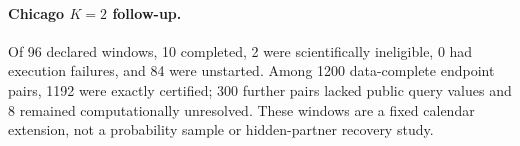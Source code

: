 \paragraph{Chicago $K=2$ follow-up.} Of 96 declared windows, 10 completed, 2 were scientifically ineligible, 0 had execution failures, and 84 were unstarted. Among 1200 data-complete endpoint pairs, 1192 were exactly certified; 300 further pairs lacked public query values and 8 remained computationally unresolved. These windows are a fixed calendar extension, not a probability sample or hidden-partner recovery study.
